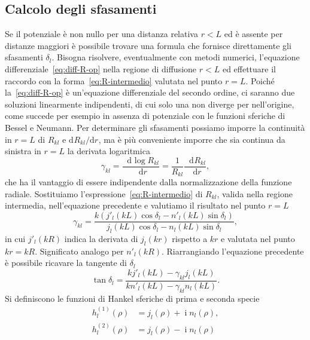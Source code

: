 \documentclass[a4paper,fleqn,twoside,12pt]{article}
\newcommand*{\dd}{\mathop{}\!\mathrm{d}} %
\DeclareMathOperator{\uimm}{\mathrm{i}} %
\newcommand*{\toder}[3][]{\frac{{\dd^{#1}}#2}{\dd {#3}^{#1}}}
\newcommand*{\ltoder}[3][]{\mathrm{d}^{#1}#2 / \mathrm{d} {#3}^{#1}}
\begin{document}
\subsection{Calcolo degli sfasamenti}
\label{sec:calcolo-sfasamenti}

Se il potenziale è non nullo per una distanza relativa $r < L$ ed è assente per
distanze maggiori è possibile trovare una formula che fornisce direttamente gli
sfasamenti $\delta_{l}$.  Bisogna risolvere, eventualmente con metodi numerici,
l'equazione differenziale~\eqref{eq:diff-R-op} nella regione di diffusione
$r < L$ ed effettuare il raccordo con la forma~\eqref{eq:R-intermedio} valutata
nel punto $r = L$.  Poiché la~\eqref{eq:diff-R-op} è un'equazione differenziale
del secondo ordine, ci saranno due soluzioni linearmente indipendenti, di cui
solo una non diverge per nell'origine, come succede per esempio in assenza di
potenziale con le funzioni sferiche di Bessel e Neumann.  Per determinare gli
sfasamenti possiamo imporre la continuità in $r=L$ di $R_{kl}$ e
$\ltoder{R_{kl}}{r}$, ma è più conveniente imporre che sia continua da sinistra
in $r=L$ la derivata logaritmica
\begin{equation}
  \gamma_{kl} = \toder{\log R_{kl}}{r} = \frac{1}{R_{kl}} \toder{R_{kl}}{r},
\end{equation}
che ha il vantaggio di essere indipendente dalla normalizzazione della funzione
radiale.  Sostituiamo l'espressione~\eqref{eq:R-intermedio} di $R_{kl}$, valida
nella regione intermedia, nell'equazione precedente e valutiamo il risultato nel
punto $r = L$
\begin{equation}
  \gamma_{kl} = \frac{k(j'_{l}(kL)\cos\delta_{l} -
    n'_{l}(kL)\sin\delta_{l})}{j_{l}(kL)\cos\delta_{l} -
    n_{l}(kL)\sin\delta_{l}},
\end{equation}
in cui $j'_{l}(kR)$ indica la derivata di $j_{l}(kr)$ rispetto a $kr$ e valutata
nel punto $kr = kR$.  Significato analogo per $n'_{l}(kR)$.  Riarrangiando
l'equazione precedente è possibile ricavare la tangente di $\delta_{l}$
\begin{equation}
  \label{eq:tangente-sfasamento}
  \tan\delta_{l} = \frac{kj'_{l}(kL) - \gamma_{kl}j_{l}(kL)}{kn'_{l}(kL) -
    \gamma_{kl}n_{l}(kL)}.
\end{equation}
Si definiscono le funzioni di Hankel sferiche di prima e seconda specie
\begin{subequations}
  \begin{align}
    h_{l}^{(1)}(\rho) &= j_{l}(\rho) + \uimm n_{l}(\rho), \\
    h_{l}^{(2)}(\rho) &= j_{l}(\rho) - \uimm n_{l}(\rho)
  \end{align}
\end{subequations}
\end{document}
